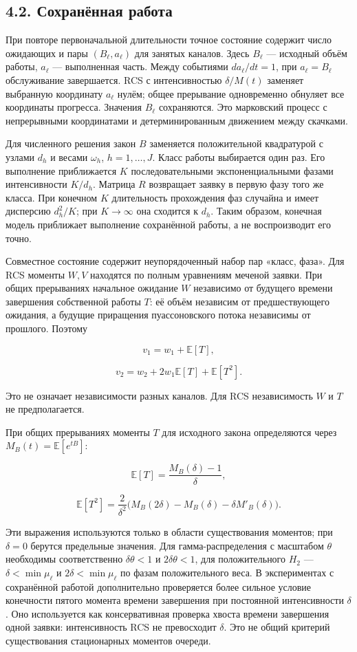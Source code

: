 \subsection*{4.2. Сохранённая работа}
При повторе первоначальной длительности точное состояние содержит число ожидающих и пары \((B_\ell,a_\ell)\) для занятых каналов. Здесь \(B_\ell\) --- исходный объём работы, \(a_\ell\) --- выполненная часть. Между событиями \(da_\ell/dt=1\), при \(a_\ell=B_\ell\) обслуживание завершается. RCS с интенсивностью \(\delta/M(t)\) заменяет выбранную координату \(a_\ell\) нулём; общее прерывание одновременно обнуляет все координаты прогресса. Значения \(B_\ell\) сохраняются. Это марковский процесс с непрерывными координатами и детерминированным движением между скачками.

Для численного решения закон \(B\) заменяется положительной квадратурой с узлами \(d_h\) и весами \(\omega_h\), \(h=1,\ldots,J\). Класс работы выбирается один раз. Его выполнение приближается \(K\) последовательными экспоненциальными фазами интенсивности \(K/d_h\). Матрица \(R\) возвращает заявку в первую фазу того же класса. При конечном \(K\) длительность прохождения фаз случайна и имеет дисперсию \(d_h^2/K\); при \(K\to\infty\) она сходится к \(d_h\). Таким образом, конечная модель приближает выполнение сохранённой работы, а не воспроизводит его точно.

Совместное состояние содержит неупорядоченный набор пар «класс, фаза». Для RCS моменты \(W,V\) находятся по полным уравнениям меченой заявки. При общих прерываниях начальное ожидание \(W\) независимо от будущего времени завершения собственной работы \(T\): её объём независим от предшествующего ожидания, а будущие приращения пуассоновского потока независимы от прошлого. Поэтому


\[v_1=w_1+\mathbb E[T],\]

\[v_2=w_2+2w_1\mathbb E[T]+\mathbb E[T^2].\]


Это не означает независимости разных каналов. Для RCS независимость \(W\) и \(T\) не предполагается.

При общих прерываниях моменты \(T\) для исходного закона определяются через \(M_B(t)=\mathbb E[e^{tB}]\):


\[\mathbb E[T]=\frac{M_B(\delta)-1}{\delta},\]

\[\mathbb E[T^2]=\frac{2}{\delta^2}\bigl(M_B(2\delta)-M_B(\delta)-\delta M'_B(\delta)\bigr).\]


Эти выражения используются только в области существования моментов; при \(\delta=0\) берутся предельные значения. Для гамма-распределения с масштабом \(\theta\) необходимы соответственно \(\delta\theta<1\) и \(2\delta\theta<1\), для положительного \(H_2\) --- \(\delta<\min\mu_\ell\) и \(2\delta<\min\mu_\ell\) по фазам положительного веса. В экспериментах с сохранённой работой дополнительно проверяется более сильное условие конечности пятого момента времени завершения при постоянной интенсивности \(\delta\). Оно используется как консервативная проверка хвоста времени завершения одной заявки: интенсивность RCS не превосходит \(\delta\). Это не общий критерий существования стационарных моментов очереди.

